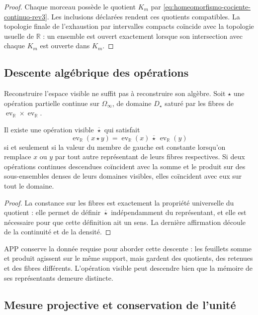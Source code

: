 \begin{proof}
Chaque morceau possède le quotient \(K_m\) par
\eqref{eq:homeomorfismo-cociente-continuo-rev3}. Les inclusions déclarées
rendent ces quotients compatibles. La topologie finale de l'exhaustion par
intervalles compacts coïncide avec la topologie usuelle de \(\mathbb R\) : un
ensemble est ouvert exactement lorsque son intersection avec chaque \(K_m\) est
ouverte dans \(K_m\).
\end{proof}

\subsection{Descente algébrique des opérations}

Reconstruire l'espace visible ne suffit pas à reconstruire son algèbre. Soit
\(\star\) une opération partielle continue sur \(\Omega_\infty\), de domaine
\(D_\star\) saturé par les fibres de
\(\operatorname{ev}_{\mathbb R}\times\operatorname{ev}_{\mathbb R}\).

\begin{theorem}
\label{thm:descenso-operaciones-continuo-rev3}
Il existe une opération visible \(\overline\star\) qui satisfait
\[
 \operatorname{ev}_{\mathbb R}(x\star y)
 =\operatorname{ev}_{\mathbb R}(x)\,\overline\star\,
  \operatorname{ev}_{\mathbb R}(y)
\]
si et seulement si la valeur du membre de gauche est constante lorsqu'on remplace
\(x\) ou \(y\) par tout autre représentant de leurs fibres respectives.
Si deux opérations continues descendues coïncident avec la somme et le produit
sur des sous-ensembles denses de leurs domaines visibles, elles coïncident avec eux sur tout
le domaine.
\end{theorem}

\begin{proof}
La constance sur les fibres est exactement la propriété universelle du
quotient : elle permet de définir \(\overline\star\) indépendamment du représentant,
et elle est nécessaire pour que cette définition ait un sens. La dernière affirmation
découle de la continuité et de la densité.
\end{proof}

APP conserve la donnée requise pour aborder cette descente : les feuillets somme et
produit agissent sur le même support, mais gardent des quotients, des retenues et des
fibres différents. L'opération visible peut descendre bien que la mémoire de
ses représentants demeure distincte.

\subsection{Mesure projective et conservation de l'unité}

